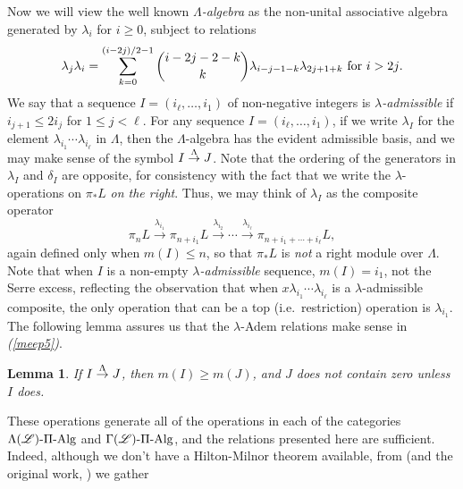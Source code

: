 \documentclass[11pt]{amsart}
\theoremstyle{plain}
\newtheorem{lem}[thm]{Lemma}
\theoremstyle{definition}
\renewcommand{\to}{\longrightarrow}
\newcommand{\scrL}{\mathscr{L}}
\theoremstyle{plain}
\newcommand{\LieOperad}{{\scrL}}
\newcommand{\PiAlg}{\textup{-$\Pi$-Alg}}
\newcommand{\minDimDelta}{m}
\newcommand{\produces}[3]{#3:#1\sim #2}
\renewcommand{\produces}[3]{#1\rightarrow_{#3} #2}%
\renewcommand{\produces}[3]{#1\overset{\smash{#3}}{\rightarrow} #2}%
\begin{document}
\begin{Constructing homotopy and cohomotopy operations}
Now we will view the well known \emph{$\Lambda$-algebra} as the non-unital associative algebra generated by $\lambda_i$ for $i\geq0$, subject to relations \[\lambda_j\lambda_i=\sum_{k=0}^{(i-2j)/2-1}{i-2j-2-k\choose k}\lambda_{i-j-1-k}\lambda_{2j+1+k}\textup{\ for $i>2j$.}\]
We say that a sequence $I=(i_\ell,\ldots,i_1)$ of non-negative integers is \emph{$\lambda$-admissible} if $i_{j+1}\leq 2i_j$ for $1\leq j <\ell$. 
For any sequence $I=(i_\ell,\ldots,i_1)$, if we write $\lambda_I$ for the element $\lambda_{i_1}\cdots \lambda_{i_\ell}$ in $\Lambda$, then the $\Lambda$-algebra has the evident admissible basis, and we may make sense of the symbol $\produces{I}{J}{\Lambda}$. Note that the ordering of the generators in $\lambda_I$ and $\delta_I$ are opposite, for consistency with the fact that we write the $\lambda$-operations on $\pi_*L$ \emph{on the right}. Thus, we may think of $\lambda_I$ as the composite operator  
\[\pi_{n}L\overset{\lambda_{i_1}}{\to}\pi_{n+i_1}L\overset{\lambda_{i_2}}{\to}\cdots \overset{\lambda_{i_\ell}}{\to}\pi_{n+i_1+\cdots +i_\ell}L,\]
again defined only when $\minDimDelta(I)\leq n$, so that $\pi_*L$ is \emph{not} a right module over $\Lambda$.
Note that when $I$ is a non-empty \emph{$\lambda$-admissible} sequence,
$\minDimDelta(I)=i_1$, not the Serre excess, reflecting the observation that when $x\lambda_{i_1}\cdots \lambda_{i_\ell}$ is a $\lambda$-admissible composite, the only operation that  can be a top (i.e.\ restriction) operation is $\lambda_{i_1}$.
The following lemma assures us that the $\lambda$-Adem relations make sense in \emph{(\ref{meep5})}.
\begin{lem}\label{lemOnAdemChangeInMLambdaPlain}
If $\produces{I}{J}{\Lambda}$, then $\minDimDelta(I)\geq\minDimDelta(J)$, and $J$ does not contain zero unless $I$ does.
\end{lem}
These operations generate all of the operations in each of the categories $\Lambda(\LieOperad)\PiAlg$ and $\Gamma(\LieOperad)\PiAlg$, and the relations presented here are sufficient. Indeed, although we don't have a Hilton-Milnor theorem available, from \cite[Theorem 8.8 and proof]{CurtisSimplicialHtpy.pdf} (and the original work, \cite{6Author.pdf}) we gather

\end{Constructing homotopy and cohomotopy operations}
\end{document}
